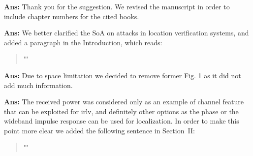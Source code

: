 \documentclass[draftcls,onecolumn,12pt]{IEEEtran}
\newcounter{revc}
\newcommand{\revp}[1]{\zref[revcontent]{#1}}
\begin{document}
\vspace{5mm} %
\begin{framed}
\end{framed}

{\bf Ans:} Thank you for the suggestion. We revised the manuscript in order to include chapter numbers for the cited books.

\vspace{5mm} %
\begin{framed}
\end{framed}
{\bf Ans:} We better clarified the SoA on attacks in location verification systems, and added a paragraph in the Introduction, which reads:
\begin{quote}
"\revp{attack1}"
\end{quote}


\vspace{5mm} %
\begin{framed}
\end{framed}

{\bf Ans:} Due to space limitation we decided to remove former Fig. 1 as it did not add much information.

\vspace{5mm} %
\begin{framed}
\end{framed}

{\bf Ans:} The received power was considered only as an example of channel feature that can be exploited for \ac{irlv}, and definitely other options as the phase or the wideband impulse response can be used for localization. In order to make this point more clear we added the following sentence in Section~II:
\begin{quote}
    "\revp{revPHASE}"
\end{quote}
\end{document}
